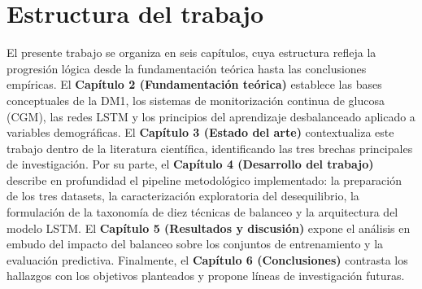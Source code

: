 \section{Estructura del trabajo}
\label{section:estructura}

El presente trabajo se organiza en seis capítulos, cuya estructura refleja la progresión lógica desde la fundamentación teórica hasta las conclusiones empíricas. El \textbf{Capítulo 2 (Fundamentación teórica)} establece las bases conceptuales de la DM1, los sistemas de monitorización continua de glucosa (CGM), las redes LSTM y los principios del aprendizaje desbalanceado aplicado a variables demográficas. El \textbf{Capítulo 3 (Estado del arte)} contextualiza este trabajo dentro de la literatura científica, identificando las tres brechas principales de investigación. Por su parte, el \textbf{Capítulo 4 (Desarrollo del trabajo)} describe en profundidad el pipeline metodológico implementado: la preparación de los tres datasets, la caracterización exploratoria del desequilibrio, la formulación de la taxonomía de diez técnicas de balanceo y la arquitectura del modelo LSTM. El \textbf{Capítulo 5 (Resultados y discusión)} expone el análisis en embudo del impacto del balanceo sobre los conjuntos de entrenamiento y la evaluación predictiva. Finalmente, el \textbf{Capítulo 6 (Conclusiones)} contrasta los hallazgos con los objetivos planteados y propone líneas de investigación futuras.
